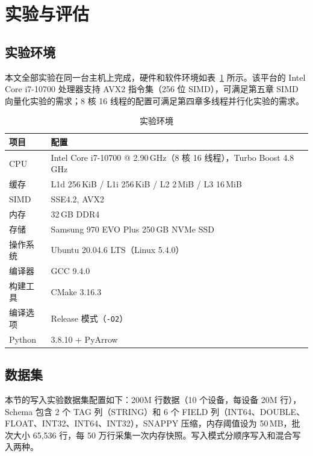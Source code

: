 
\section{实验与评估}

\subsection{实验环境}
\label{subsec:experiment-env}

本文全部实验在同一台主机上完成，硬件和软件环境如表~\ref{tab:experiment-env} 所示。该平台的 Intel Core i7-10700 处理器支持 AVX2 指令集（256 位 SIMD），可满足第五章 SIMD 向量化实验的需求；8 核 16 线程的配置可满足第四章多线程并行化实验的需求。

\begin{table}[htbp]
  \centering
  \caption{实验环境}
  \label{tab:experiment-env}
  \begin{tabularx}{\textwidth}{l X}
    \toprule
    项目 & 配置 \\
    \midrule
    CPU & Intel Core i7-10700 @ 2.90\,GHz（8 核 16 线程），Turbo Boost 4.8\,GHz \\
    缓存 & L1d 256\,KiB / L1i 256\,KiB / L2 2\,MiB / L3 16\,MiB \\
    SIMD & SSE4.2, AVX2 \\
    内存 & 32\,GB DDR4 \\
    存储 & Samsung 970 EVO Plus 250\,GB NVMe SSD \\
    操作系统 & Ubuntu 20.04.6 LTS（Linux 5.4.0） \\
    编译器 & GCC 9.4.0 \\
    构建工具 & CMake 3.16.3 \\
    编译选项 & Release 模式（\texttt{-O2}） \\
    Python & 3.8.10 + PyArrow \\
    \bottomrule
  \end{tabularx}
\end{table}

\subsection{数据集}

本节的写入实验数据集配置如下：200M 行数据（10 个设备，每设备 20M 行），Schema 包含 2 个 TAG 列（STRING）和 6 个 FIELD 列（INT64、DOUBLE、FLOAT、INT32、INT64、INT32），SNAPPY 压缩，内存阈值设为 50\,MB，批次大小 65,536 行，每 50 万行采集一次内存快照。写入模式分顺序写入和混合写入两种。


